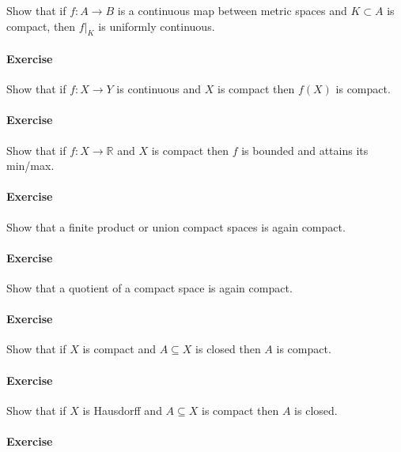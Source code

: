 Show that if \(f: A\to B\) is a continuous map between metric spaces and
\(K\subset A\) is compact, then \({\left.{{f}} \right|_{{K}} }\) is
uniformly continuous.

\hypertarget{exercise-17}{%
\paragraph{Exercise}\label{exercise-17}}

Show that if \(f:X\to Y\) is continuous and \(X\) is compact then
\(f(X)\) is compact.

\hypertarget{exercise-18}{%
\paragraph{Exercise}\label{exercise-18}}

Show that if \(f:X\to {\mathbb{R}}\) and \(X\) is compact then \(f\) is
bounded and attains its min/max.

\hypertarget{exercise-19}{%
\paragraph{Exercise}\label{exercise-19}}

Show that a finite product or union compact spaces is again compact.

\hypertarget{exercise-20}{%
\paragraph{Exercise}\label{exercise-20}}

Show that a quotient of a compact space is again compact.

\hypertarget{exercise-21}{%
\paragraph{Exercise}\label{exercise-21}}

Show that if \(X\) is compact and \(A\subseteq X\) is closed then \(A\)
is compact.

\hypertarget{exercise-22}{%
\paragraph{Exercise}\label{exercise-22}}

Show that if \(X\) is Hausdorff and \(A\subseteq X\) is compact then
\(A\) is closed.

\hypertarget{exercise-23}{%
\paragraph{Exercise}\label{exercise-23}}

